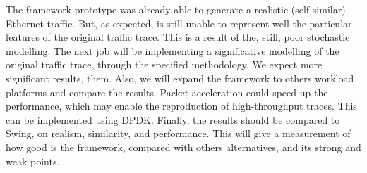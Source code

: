 The framework prototype was already able to generate a realistic (self-similar) Ethernet traffic. But, as expected, is still unable to represent well the particular features of the original traffic trace. This is a result of the, still, poor stochastic modelling. The next job will be implementing a significative modelling of the original traffic trace, through the specified methodology. We expect more significant results, them. Also, we will expand the framework to others workload platforms and compare the results. Packet acceleration could speed-up the performance, which may enable the reproduction of high-throughput traces. This can be implemented using DPDK. Finally, the results should be compared to Swing, on realism, similarity, and performance. This will give a measurement of how good is the framework, compared with others alternatives, and its strong and weak points. 

